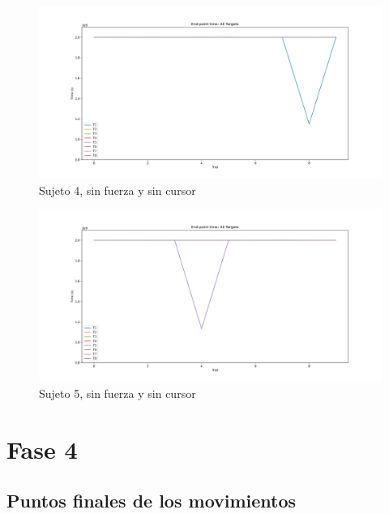 \documentclass[a4paper,11pt, oneside]{book}
\begin{document}
\begin{figure}[H]
	\includegraphics[width=\linewidth]{sujeto4/no_force_no_cursor/evolution_time}
	\caption{Sujeto 4, sin  fuerza y sin cursor}
	\label{4-3-4}
\end{figure}
\begin{figure}[H]
	\includegraphics[width=\linewidth]{sujeto5/no_force_no_cursor/evolution_time}
	\caption{Sujeto 5, sin  fuerza y sin cursor}
	\label{5-3-4}
\end{figure}



\chapter{Fase 4}

\section{Puntos finales de los movimientos}
\label{anexo:7}
\end{document}
